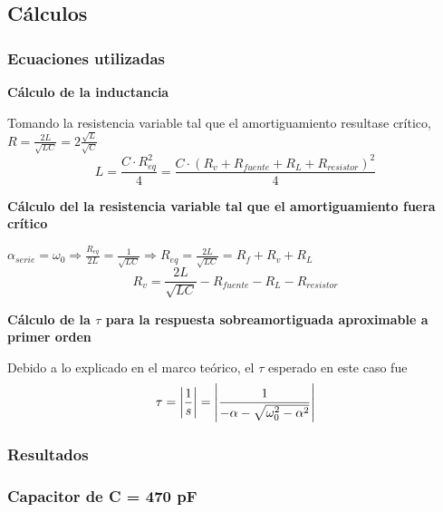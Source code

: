 \documentclass{article}
\begin{document}
                
    \subsection{Cálculos}

        \subsubsection*{Ecuaciones utilizadas}            

            \textbf{Cálculo de la inductancia} \par
            Tomando la resistencia variable tal que el amortiguamiento resultase crítico,
            $ R = \frac{2L}{\sqrt{LC}} = 2\frac{\sqrt{L}}{\sqrt{C}} $
            \begin{equation}
                L = \frac{C \cdot R_{eq}^2}{4} = \frac{C \cdot (R_v+R_{fuente}+R_L+R_{resistor})^2}{4}
            \end{equation}

            \textbf{Cálculo del la resistencia variable tal que el amortiguamiento fuera crítico} \par \par
            $ \alpha_{serie} = \omega_0 
            \Rightarrow \frac{R_{eq}}{2L} = \frac{1}{\sqrt{LC}} 
            \Rightarrow R_{eq} = \frac{2L}{\sqrt{LC}}= R_f + R_v + R_L
            $
            \begin{equation}
                R_v = \frac{2L}{\sqrt{LC}} - R_{fuente} - R_L - R_{resistor} 
            \end{equation}  \par

            \textbf{Cálculo de la $\tau$ para la respuesta sobreamortiguada aproximable a primer orden} \par
            Debido a lo explicado en el marco teórico, el $\tau$ esperado en este caso fue
            \begin{equation*}
               \tau = \abs{ \frac{1}{s} } = \abs{ \frac{1}{-\alpha-\sqrt{\omega_0^2 - \alpha^2}} }
            \end{equation*}
            
        \subsubsection*{Resultados}

            \subsubsection*{Capacitor de C = 470 pF}
\end{document}
